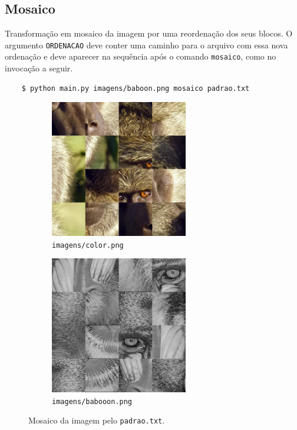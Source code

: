 \subsection{Mosaico} \label{sec:mosaico}

Transformação em mosaico da imagem por uma reordenação dos seus blocos. O argumento \texttt{ORDENACAO} deve conter uma caminho para o arquivo com essa nova ordenação e deve aparecer na sequência após o comando \texttt{mosaico}, como no invocação a seguir.

\begin{verbatim}
    $ python main.py imagens/baboon.png mosaico padrao.txt
\end{verbatim}

\begin{figure}[H]
    \centering
    \begin{subfigure}{0.45\textwidth}
        \centering
        \includegraphics[width=6cm]{resultados/colormsc.png}
        \caption{\texttt{imagens/color.png}}
    \end{subfigure}%
    \begin{subfigure}{0.45\textwidth}
        \centering
        \includegraphics[width=6cm]{resultados/baboonmsc.png}
        \caption{\texttt{imagens/babooon.png}}
        \label{fig:res:10}
    \end{subfigure}

    \caption{Mosaico da imagem pelo \texttt{padrao.txt}.}
\end{figure}

